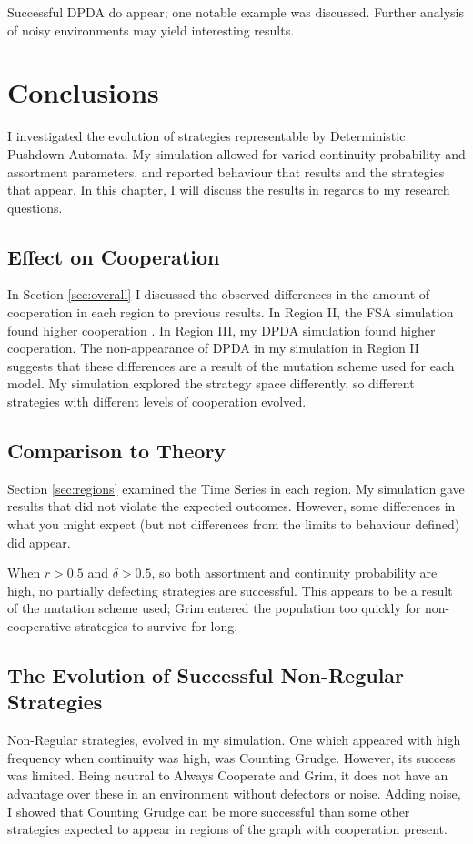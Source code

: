 \documentclass[a4paper,11pt,bcshonoursthesis,singlespace,oneside,thesisdraft,pdflatex]{cssethesis}
\begin{document}
Successful DPDA do appear; one notable example was discussed. 
Further analysis of noisy environments may yield interesting results.
\chapter{Conclusions}
\label{chap:conclusions}
I investigated the evolution of strategies representable by Deterministic Pushdown Automata. 
My simulation allowed for varied continuity probability and assortment parameters, and reported behaviour that results and the strategies that appear. In this chapter, I will discuss the results in regards to my research questions.
\section{Effect on Cooperation}
In Section \ref{sec:overall} I discussed the observed differences in the amount of cooperation in each region to previous results. 
In Region II, the FSA simulation found higher cooperation \citep{van-veelen:PNAS:2012}. 
In Region III, my DPDA simulation found higher cooperation. 
The non-appearance of DPDA in my simulation in Region II suggests that these differences are a result of the mutation scheme used for each model. 
My simulation explored the strategy space differently, so different strategies with different levels of cooperation evolved. 
\section{Comparison to Theory}
Section \ref{sec:regions} examined the Time Series in each region. 
My simulation gave results that did not violate the expected outcomes. 
However, some differences in what you might expect (but not differences from the limits to behaviour \citep{van-veelen:PNAS:2012} defined) did appear. 

When $r>0.5$ and $\delta>0.5$, so both assortment and continuity probability are high, no partially defecting strategies are successful. 
This appears to be a result of the mutation scheme used; Grim entered the population too quickly for non-cooperative strategies to survive for long.
\section{The Evolution of Successful Non-Regular Strategies}
\label{sec:dpda}
Non-Regular strategies, evolved in my simulation. One which appeared with high frequency when continuity was high, was Counting Grudge. 
However, its success was limited. 
Being neutral to Always Cooperate and Grim, it does not have an advantage over these in an environment without defectors or noise. 
Adding noise, I showed that Counting Grudge can be more successful than some other strategies expected to appear in regions of the graph with cooperation present. 
\end{document}

